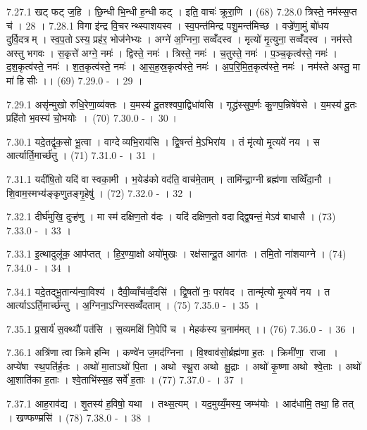 7.27.1
खट् फट् ज॒हि । छि॒न्धी भि॒न्धी ह॒न्धी कट् । इति॒ वाचः॑ क्रूरा॒णि । (68)
7.28.0
त्रिस्ते॒ नम॑स्स॒प्त च॑ । 28 ।
7.28.1
विगा इ॑न्द्र वि॒चरन्थ्स्पाशयस्व । स्व॒पन्त॑मिन्द्र पशु॒मन्त॑मिच्छ । वज्रे॑णा॒मुं बो॑धय दुर्वि॒दत्रम् । स्व॒प॒तोऽस्य॒ प्रह॑र॒ भोज॑नेभ्यः । अग्ने॑ अ॒ग्निना॒ सव्वँ॑दस्व । मृत्यो॑ मृ॒त्युना॒ सव्वँ॑दस्व । नम॑स्ते अस्तु भगवः । स॒कृत्ते॑ अग्ने॒ नमः॑ । द्विस्ते॒ नमः॑ । त्रिस्ते॒ नमः॑ । च॒तुस्ते॒ नमः॑ । प॒ञ्च॒कृत्व॑स्ते॒ नमः॑ । द॒श॒कृत्व॑स्ते॒ नमः॑ । श॒त॒कृत्व॑स्ते॒ नमः॑ । आ॒स॒ह॒स्र॒कृत्व॑स्ते॒ नमः॑ । अ॒प॒रि॒मि॒त॒कृत्व॑स्ते॒ नमः॑ । नम॑स्ते अस्तु॒ मा मा॑ हिसीः ।। (69)
7.29.0
- । 29 ।
\anuvakamend

7.29.1
असृ॑न्मुखो रुधि॒रेणा॒व्य॑क्तः । य॒मस्य॑ दू॒तश्श्वपा॒द्विधा॑वसि । गृद्ध्र॑स्सुप॒र्णः कु॒णप॒न्निषे॑वसे । य॒मस्य॑ दू॒तः प्रहि॑तो भ॒वस्य॑ चो॒भयोः । (70)
7.30.0
- । 30 ।
\anuvakamend

7.30.1
यदे॒तद्वृ॑क॒सो भू॒त्वा । वाग्देव्यभि॒राय॑सि । द्वि॒षन्तं॑ मे॒ऽभिरा॑य । तं मृ॑त्यो मृ॒त्यवे॑ नय । स आर्त्यार्ति॒मार्च्छ॑तु । (71)
7.31.0
- । 31 ।
\anuvakamend

7.31.1
यदी॑षि॒तो यदि॑ वा स्वका॒मी । भ॒येड॑को वद॑ति॒ वाच॑मे॒ताम् । तामि॑न्द्रा॒ग्नी ब्रह्म॑णा सव्विँदा॒नौ । शि॒वाम॒स्मभ्य॑ङ्कृणुतङ्गृ॒हेषु॑ । (72)
7.32.0
- । 32 ।
\anuvakamend

7.32.1
दीर्घ॑मुखि॒ दुऱ्ह॑णु । मा स्म॑ दक्षिण॒तो व॑दः । यदि॑ दक्षिण॒तो वदाद्द्वि॒षन्तं॒ मेऽव॑ बाधासै । (73)
7.33.0
- । 33 ।
\anuvakamend

7.33.1
इ॒त्थादुलू॑क॒ आप॑प्तत् । हि॒र॒ण्या॒क्षो अयो॑मुखः । रक्ष॑सान्दू॒त आग॑तः । तमि॒तो ना॑शयाग्ने । (74)
7.34.0
- । 34 ।
\anuvakamend

7.34.1
यदे॒तद्भू॒तान्य॑न्वा॒विश्य॑ । दैवी॒व्वाँच॑व्वँ॒दसि॑ । द्वि॒षतो॑ नः॒ परा॑वद । तान्मृ॑त्यो मृ॒त्यवे॑ नय । त आर्त्याऽऽर्ति॒मार्च्छ॑न्तु । अ॒ग्निना॒ऽग्निस्सव्वँ॑दताम् । (75)
7.35.0
- । 35 ।
\anuvakamend

7.35.1
प्र॒सार्य॑ स॒क्थ्यौ॑ पत॑सि । स॒व्यमक्षि॑ नि॒पेपि॑ च । मेहक॑स्य च॒नाम॑मत् ।। (76)
7.36.0
- । 36 ।
\anuvakamend

7.36.1
अत्रि॑णा त्वा क्रिमे हन्मि । कण्वे॑न ज॒मद॑ग्निना । वि॒श्वाव॑सो॒र्ब्रह्म॑णा ह॒तः । क्रिमी॑णा॒ राजा । अप्ये॑षा स्थ॒पति॑र्ह॒तः । अथो॑ मा॒ताऽथो॑ पि॒ता । अथो स्थू॒रा अथो क्षु॒द्राः । अथो॑ कृ॒ष्णा अथो श्वे॒ताः । अथो॑ आ॒शाति॑का ह॒ताः । श्वे॒ताभि॑स्स॒ह सर्वे॑ ह॒ताः । (77)
7.37.0
- । 37 ।
\anuvakamend

7.37.1
आह॒राव॑द्य । शृ॒तस्य॑ ह॒विषो॒ यथा । तथ्स॒त्यम् । यद॒मुय्यँ॒मस्य॒ जम्भ॑योः । आद॑धामि॒ तथा॒ हि तत् । खण्फण्म्रसि॑ । (78)
7.38.0
- । 38 ।
\anuvakamend

